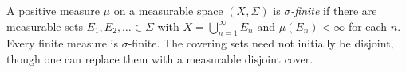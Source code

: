 
A positive measure $\mu$ on a measurable space $(X,\Sigma)$ is \emph{$\sigma$-finite} if there are measurable sets $E_1,E_2,\ldots\in\Sigma$ with $X=\bigcup_{n=1}^{\infty}E_n$ and $\mu(E_n)<\infty$ for each $n$. Every finite measure is $\sigma$-finite. The covering sets need not initially be disjoint, though one can replace them with a measurable disjoint cover.
